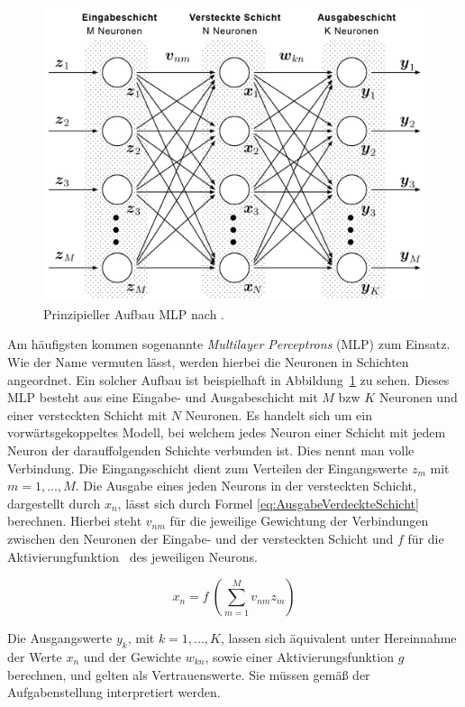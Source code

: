 \documentclass[times, 12pt,twocolumn]{article}
\begin{document}
\begin{figure}
	\flushleft
	\includegraphics[width=\columnwidth]{Bilder/structure-mlp.jpg}
	\caption{Prinzipieller Aufbau MLP nach \cite{MDPI}.}
	\label{fig:MLP}
\end{figure}

Am häufigsten kommen sogenannte \textit{Multilayer Perceptrons} (MLP)  \cite{NNBraun}\cite{NNNauck}\cite{NNStanley} zum Einsatz. Wie der Name vermuten lässt, werden hierbei die Neuronen in Schichten angeordnet. Ein solcher Aufbau ist beispielhaft in Abbildung~\ref{fig:MLP} zu sehen. Dieses MLP besteht aus eine Eingabe- und Ausgabeschicht mit $M$ bzw $K$ Neuronen und einer versteckten Schicht mit $N$ Neuronen. Es handelt sich um ein vorwärtsgekoppeltes Modell, bei welchem jedes Neuron einer Schicht mit jedem Neuron der darauffolgenden Schichte verbunden ist. Dies nennt man volle Verbindung. Die Eingangsschicht dient zum Verteilen der Eingangswerte $z_m$ mit $m=1,...,M$. Die Ausgabe eines jeden Neurons in der versteckten Schicht, dargestellt durch $x_n$, lässt sich durch Formel \ref{eq:AusgabeVerdeckteSchicht} berechnen. Hierbei steht $v_{nm}$ für die jeweilige Gewichtung der Verbindungen zwischen den Neuronen der Eingabe- und der versteckten Schicht und $f$ für die Aktivierungfunktion~\cite{NNStanley}\cite{NNHaykin} des jeweiligen Neurons. 

\footnotesize
\begin{equation} 
x_n = f~(\sum_{m=1}^M v_{nm}z_m)
	\label{eq:AusgabeVerdeckteSchicht}
\end{equation}
\small

Die Ausgangswerte $y_k$, mit $k=1,...,K$, lassen sich äquivalent unter Hereinnahme der Werte $x_n$ und der Gewichte $w_{kn}$, sowie einer Aktivierungsfunktion $g$ berechnen, und gelten als Vertrauenswerte. Sie müssen gemäß der Aufgabenstellung interpretiert werden. 
\end{document}
